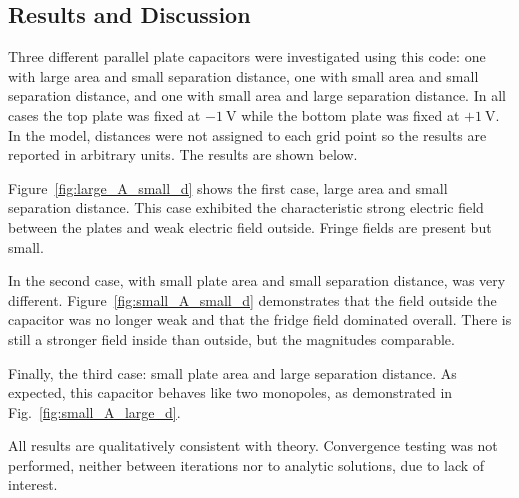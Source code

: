 \documentclass[12pt,twocolumn]{article}
\begin{document}
\subsection{Results and Discussion}
Three different parallel plate capacitors were investigated using this code: one with large area and small separation distance, one with small area and small separation distance, and one with small area and large separation distance. In all cases the top plate was fixed at $-1~\si{\volt}$ while the bottom plate was fixed at $+1~\si{\volt}$. In the model, distances were not assigned to each grid point so the results are reported in arbitrary units. The results are shown below.

Figure~\ref{fig:large_A_small_d} shows the first case, large area and small separation distance. This case exhibited the characteristic strong electric field between the plates and weak electric field outside. Fringe fields are present but small.

In the second case, with small plate area and small separation distance, was very different. Figure~\ref{fig:small_A_small_d} demonstrates that the field outside the capacitor was no longer weak and that the fridge field dominated overall. There is still a stronger field inside than outside, but the magnitudes comparable.

Finally, the third case: small plate area and large separation distance. As expected, this capacitor behaves like two monopoles, as demonstrated in Fig.~\ref{fig:small_A_large_d}.

All results are qualitatively consistent with theory. Convergence testing was not performed, neither between iterations nor to analytic solutions, due to lack of interest.
\end{document}
